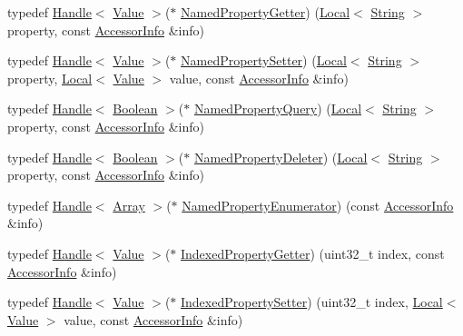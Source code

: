 \begin{DoxyCompactItemize}
\item 
typedef \hyperlink{classv8_1_1_handle}{Handle}$<$ \hyperlink{classv8_1_1_value}{Value} $>$($\ast$ \hyperlink{namespacev8_ab9effde41da1c073eddbd4a11a62bd0b}{Named\+Property\+Getter}) (\hyperlink{classv8_1_1_local}{Local}$<$ \hyperlink{classv8_1_1_string}{String} $>$ property, const \hyperlink{classv8_1_1_accessor_info}{Accessor\+Info} \&info)
\item 
typedef \hyperlink{classv8_1_1_handle}{Handle}$<$ \hyperlink{classv8_1_1_value}{Value} $>$($\ast$ \hyperlink{namespacev8_a682b1fc46feab32605c4905612ffe870}{Named\+Property\+Setter}) (\hyperlink{classv8_1_1_local}{Local}$<$ \hyperlink{classv8_1_1_string}{String} $>$ property, \hyperlink{classv8_1_1_local}{Local}$<$ \hyperlink{classv8_1_1_value}{Value} $>$ value, const \hyperlink{classv8_1_1_accessor_info}{Accessor\+Info} \&info)
\item 
typedef \hyperlink{classv8_1_1_handle}{Handle}$<$ \hyperlink{classv8_1_1_boolean}{Boolean} $>$($\ast$ \hyperlink{namespacev8_a57686a4cebfd2ecbe3a333e7f05463ee}{Named\+Property\+Query}) (\hyperlink{classv8_1_1_local}{Local}$<$ \hyperlink{classv8_1_1_string}{String} $>$ property, const \hyperlink{classv8_1_1_accessor_info}{Accessor\+Info} \&info)
\item 
typedef \hyperlink{classv8_1_1_handle}{Handle}$<$ \hyperlink{classv8_1_1_boolean}{Boolean} $>$($\ast$ \hyperlink{namespacev8_a7899471fae82b252750b81f41d5c1e26}{Named\+Property\+Deleter}) (\hyperlink{classv8_1_1_local}{Local}$<$ \hyperlink{classv8_1_1_string}{String} $>$ property, const \hyperlink{classv8_1_1_accessor_info}{Accessor\+Info} \&info)
\item 
typedef \hyperlink{classv8_1_1_handle}{Handle}$<$ \hyperlink{classv8_1_1_array}{Array} $>$($\ast$ \hyperlink{namespacev8_acbd04b83708cb5a80e73e0396f176e58}{Named\+Property\+Enumerator}) (const \hyperlink{classv8_1_1_accessor_info}{Accessor\+Info} \&info)
\item 
typedef \hyperlink{classv8_1_1_handle}{Handle}$<$ \hyperlink{classv8_1_1_value}{Value} $>$($\ast$ \hyperlink{namespacev8_abf3be19b5157493da3859987cc50c6ab}{Indexed\+Property\+Getter}) (uint32\+\_\+t index, const \hyperlink{classv8_1_1_accessor_info}{Accessor\+Info} \&info)
\item 
typedef \hyperlink{classv8_1_1_handle}{Handle}$<$ \hyperlink{classv8_1_1_value}{Value} $>$($\ast$ \hyperlink{namespacev8_a3ca53e294b9b695b3777af904ca942b6}{Indexed\+Property\+Setter}) (uint32\+\_\+t index, \hyperlink{classv8_1_1_local}{Local}$<$ \hyperlink{classv8_1_1_value}{Value} $>$ value, const \hyperlink{classv8_1_1_accessor_info}{Accessor\+Info} \&info)

\end{DoxyCompactItemize}
